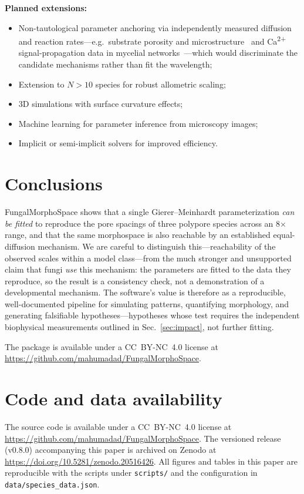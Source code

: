 \documentclass[review,3p]{elsarticle}
\begin{document}
\textbf{Planned extensions:}
\begin{itemize}
  \item Non-tautological parameter anchoring via independently measured
    diffusion and reaction rates---e.g.\ substrate porosity and
    microstructure~\cite{klemm2024} and \mbox{Ca\textsuperscript{2+}}
    signal-propagation data in mycelial networks~\cite{itani2023}---which
    would discriminate the candidate mechanisms rather than fit the
    wavelength;
  \item Extension to $N > 10$ species for robust allometric scaling;
  \item 3D simulations with surface curvature effects;
  \item Machine learning for parameter inference from microscopy
    images;
  \item Implicit or semi-implicit solvers for improved efficiency.
\end{itemize}


\section{Conclusions}
\label{sec:conclusions}

FungalMorphoSpace shows that a single Gierer--Meinhardt parameterization
\emph{can be fitted} to reproduce the pore spacings of three polypore
species across an 8$\times$ range, and that the same morphospace is also
reachable by an established equal-diffusion mechanism. We are careful to
distinguish this---reachability of the observed scales within a model
class---from the much stronger and unsupported claim that fungi
\emph{use} this mechanism: the parameters are fitted to the data they
reproduce, so the result is a consistency check, not a demonstration of a
developmental mechanism. The software's value is therefore as a
reproducible, well-documented pipeline for simulating patterns,
quantifying morphology, and generating falsifiable hypotheses---hypotheses
whose test requires the independent biophysical measurements outlined in
Sec.~\ref{sec:impact}, not further fitting.

The package is available under a CC~BY-NC~4.0 license at
\url{https://github.com/mahumadad/FungalMorphoSpace}.


\section*{Code and data availability}
The source code is available under a CC~BY-NC~4.0 license at
\url{https://github.com/mahumadad/FungalMorphoSpace}. The versioned release
(v0.8.0) accompanying this paper is archived on Zenodo at
\url{https://doi.org/10.5281/zenodo.20516426}. All figures and
tables in this paper are reproducible with the scripts under
\texttt{scripts/} and the configuration in \texttt{data/species\_data.json}.
\end{document}

